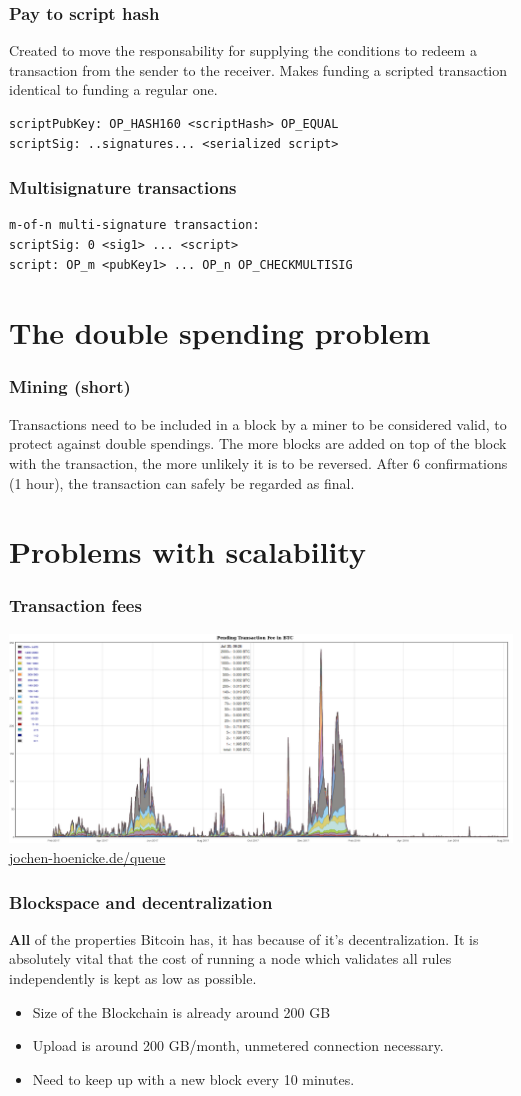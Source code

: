 \documentclass{beamer}
\begin{document}
\begin{frame}[fragile]
\frametitle{Pay to script hash}
Created to move the responsability for supplying the conditions to 
redeem a transaction from the sender to the receiver. Makes funding a scripted transaction identical to funding a regular one.
\begin{verbatim}
scriptPubKey: OP_HASH160 <scriptHash> OP_EQUAL 
scriptSig: ..signatures... <serialized script>
\end{verbatim}
\end{frame}
\begin{frame}[fragile]
\frametitle{Multisignature transactions}
\begin{verbatim}
m-of-n multi-signature transaction:
scriptSig: 0 <sig1> ... <script>
script: OP_m <pubKey1> ... OP_n OP_CHECKMULTISIG
\end{verbatim}
\end{frame}
\section{The double spending problem}
\begin{frame}
\frametitle{Mining (short)}
Transactions need to be included in a block by a miner to be considered valid, to protect against double spendings. The more blocks are added  on top of the block with the transaction, the more unlikely it is to be reversed. After 6 confirmations (1 hour), the transaction can safely be regarded as final.
\end{frame}
\section{Problems with scalability}
\begin{frame}
\frametitle{Transaction fees}
\includegraphics[scale=0.25]{images/fees.png}\\
\url{jochen-hoenicke.de/queue}
\end{frame}
\begin{frame}
\frametitle{Blockspace and decentralization}
\textbf{All} of the properties Bitcoin has, it has because of it's decentralization. It is absolutely vital that the cost of running a node which validates all rules independently is kept as low as possible.
\begin{itemize}
\item Size of the Blockchain is already around 200 GB
\item Upload is around 200 GB/month, unmetered connection necessary.
\item Need to keep up with a new block every 10 minutes.
\end{itemize}
\end{frame}
\end{document}
